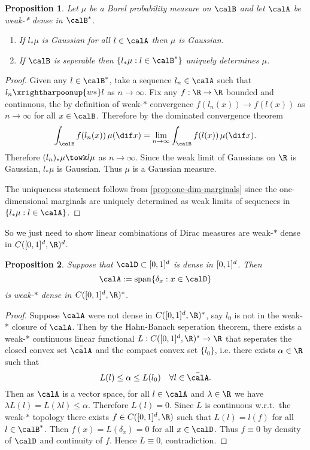 \documentclass[fontsize=12pt, DIV=10]{scrreprt}
\theoremstyle{mydefn}
\newtheorem{prop}{Proposition}
\theoremstyle{remark}
\newcommand{\defeq}{:=}
\DeclareMathOperator{\spn}{span}
\begin{document}
\begin{prop}
	\label{prop:weak-star-suff}
	Let $\mu$ be a Borel probability measure on $\calB$ and let $\calA$ be weak-* dense in $\calB^*$. 
	\begin{enumerate}
		\item If $l_* \mu$ is Gaussian for all $l \in \calA$ then $\mu$ is Gaussian.
		\item If $\calB$ is seperable then $\{l_* \mu : l \in \calB^*\}$ uniquely determines $\mu$.
	\end{enumerate}
\end{prop}
\begin{proof}
	Given any $l \in \calB^*$, take a sequence $l_n \in \calA$ such that $l_n \xrightharpoonup{w*} l$ as $n \to \infty$. Fix any $f: \R \to \R$ bounded and continuous, the by definition of weak-$*$ convergence $f(l_n(x)) \to f(l(x))$ as $n \to \infty$ for all $x \in \calB$. Therefore by the dominated convergence theorem
	\begin{equation}
		\int_{\calB} f(l_n(x)) \, \mu(\dif x) = \lim_{n \to \infty} \int_{\calB} f(l(x)) \, \mu(\dif x).
	\end{equation}
	Therefore $(l_n)_* \mu \towk l \mu$ as $n \to \infty$. Since the weak limit of Gaussians on $\R$ is Gaussian, $l_* \mu$ is Gaussian. Thus $\mu$ is a Gaussian measure.


	The uniqueness statement follows from \vref{prop:one-dim-marginals} since the one-dimensional marginals are uniquely determined as weak limits of sequences in $\{l_* \mu : l \in \calA\}$.
\end{proof}

So we just need to show linear combinations of Dirac measures are weak-$*$ dense in $C(\unitbox, \R)^d$.
\begin{prop}
	\label{prop:dirac-density}
	Suppose that $\calD \subset \unitbox$ is dense in $[0,1]^d$. Then 
	\begin{equation}
		\calA \defeq \spn\{\delta_x : x \in \calD\}
	\end{equation}
	is weak-$*$ dense in $C(\unitbox, \R)^*$.
\end{prop}
\begin{proof}
	Suppose $\calA$ were not dense in $C(\unitbox, \R)^*$, say $l_0$ is not in the weak-* closure of $\calA$. Then by the Hahn-Banach seperation theorem, there exists a weak-* continuous linear functional $L: C(\unitbox, \R)^* \to \R$ that seperates the closed convex set $\bar{\calA}$ and the compact convex set $\{l_0\}$, i.e. there exists $\alpha \in \R$ such that
	\begin{equation}
		L(l) \leq \alpha \leq L(l_0) \quad \forall l \in \bar{\calA}.
	\end{equation}
	Then as $\calA$ is a vector space, for all $l \in \calA$ and $\lambda \in \R$ we have $\lambda L(l) = L(\lambda l) \leq \alpha$. Therefore $L(l) = 0$. Since $L$ is continuous w.r.t.\ the weak-$*$ topology there exists $f \in C(\unitbox, \R)$ such that $L(l) = l(f)$ for all $l \in \calB^*$. Then $f(x) = L(\delta_x) = 0$ for all $x \in \calD$. Thus $f \equiv 0$ by density of $\calD$ and continuity of $f$. Hence $L \equiv 0$, contradiction.
\end{proof}
\end{document}
